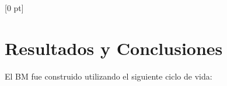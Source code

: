 \titlespacing{\chapter}{0 pt}{30 pt}{50 pt}[0 pt]
\titleformat{\section}{\Large\bfseries}{\thesection}{0 pt}{\hspace{30 pt}}
\titleformat{\subsection}{\large\bfseries}{\thesubsection}{0 pt}{\hspace{30 pt}}
\pagestyle{fancy}
\fancyhead[LO,LE]{\footnotesize\emph{\leftmark}}
\fancyhead[RO,RE]{\thepage}
\fancyfoot[CO,CE]{}

\chapter{Resultados y Conclusiones} %

\normalsize
\noindent
El BM fue construido utilizando el siguiente ciclo de vida:

